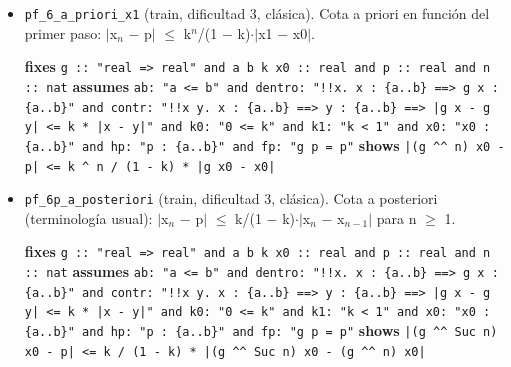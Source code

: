 \documentclass[11pt,a4paper]{article}
\begin{document}
\begin{itemize}
  \item \texttt{pf\_\allowbreak{}6\_\allowbreak{}a\_\allowbreak{}priori\_\allowbreak{}x1} (train, dificultad 3, clásica). Cota a priori en función del primer paso: $|$x$_{n}$ $-$ p$|$ $\le $ k$^{n}$/(1 $-$ k)$\cdot |$x1 $-$ x0$|$.\\
  {\footnotesize \textbf{fixes} \texttt{g :\allowbreak{}:\allowbreak{} "real =\allowbreak{}> real" and a b k x0 :\allowbreak{}:\allowbreak{} real and p :\allowbreak{}:\allowbreak{} real and n :\allowbreak{}:\allowbreak{} nat} \textbf{assumes} \texttt{ab:\allowbreak{} "a <=\allowbreak{} b" and dentro:\allowbreak{} "!{}!x. x :\allowbreak{} \{a..b\} =\allowbreak{}=\allowbreak{}> g x :\allowbreak{} \{a..b\}" and contr:\allowbreak{} "!{}!x y. x :\allowbreak{} \{a..b\} =\allowbreak{}=\allowbreak{}> y :\allowbreak{} \{a..b\} =\allowbreak{}=\allowbreak{}> |\allowbreak{}g x -\allowbreak{} g y|\allowbreak{} <=\allowbreak{} k *\allowbreak{} |\allowbreak{}x -\allowbreak{} y|\allowbreak{}" and k0:\allowbreak{} "0 <=\allowbreak{} k" and k1:\allowbreak{} "k < 1" and x0:\allowbreak{} "x0 :\allowbreak{} \{a..b\}" and hp:\allowbreak{} "p :\allowbreak{} \{a..b\}" and fp:\allowbreak{} "g p =\allowbreak{} p"} \textbf{shows} \texttt{|\allowbreak{}(\allowbreak{}g \textasciicircum{}\textasciicircum{} n) x0 -\allowbreak{} p|\allowbreak{} <=\allowbreak{} k \textasciicircum{} n /\allowbreak{} (\allowbreak{}1 -\allowbreak{} k) *\allowbreak{} |\allowbreak{}g x0 -\allowbreak{} x0|\allowbreak{}}\par}
  \item \texttt{pf\_\allowbreak{}6p\_\allowbreak{}a\_\allowbreak{}posteriori} (train, dificultad 3, clásica). Cota a posteriori (terminología usual): $|$x$_{n}$ $-$ p$|$ $\le $ k/(1 $-$ k)$\cdot |$x$_{n}$ $-$ x$_{n-1}|$ para n $\ge $ 1.\\
  {\footnotesize \textbf{fixes} \texttt{g :\allowbreak{}:\allowbreak{} "real =\allowbreak{}> real" and a b k x0 :\allowbreak{}:\allowbreak{} real and p :\allowbreak{}:\allowbreak{} real and n :\allowbreak{}:\allowbreak{} nat} \textbf{assumes} \texttt{ab:\allowbreak{} "a <=\allowbreak{} b" and dentro:\allowbreak{} "!{}!x. x :\allowbreak{} \{a..b\} =\allowbreak{}=\allowbreak{}> g x :\allowbreak{} \{a..b\}" and contr:\allowbreak{} "!{}!x y. x :\allowbreak{} \{a..b\} =\allowbreak{}=\allowbreak{}> y :\allowbreak{} \{a..b\} =\allowbreak{}=\allowbreak{}> |\allowbreak{}g x -\allowbreak{} g y|\allowbreak{} <=\allowbreak{} k *\allowbreak{} |\allowbreak{}x -\allowbreak{} y|\allowbreak{}" and k0:\allowbreak{} "0 <=\allowbreak{} k" and k1:\allowbreak{} "k < 1" and x0:\allowbreak{} "x0 :\allowbreak{} \{a..b\}" and hp:\allowbreak{} "p :\allowbreak{} \{a..b\}" and fp:\allowbreak{} "g p =\allowbreak{} p"} \textbf{shows} \texttt{|\allowbreak{}(\allowbreak{}g \textasciicircum{}\textasciicircum{} Suc n) x0 -\allowbreak{} p|\allowbreak{} <=\allowbreak{} k /\allowbreak{} (\allowbreak{}1 -\allowbreak{} k) *\allowbreak{} |\allowbreak{}(\allowbreak{}g \textasciicircum{}\textasciicircum{} Suc n) x0 -\allowbreak{} (\allowbreak{}g \textasciicircum{}\textasciicircum{} n) x0|\allowbreak{}}\par}

\end{itemize}
\end{document}
